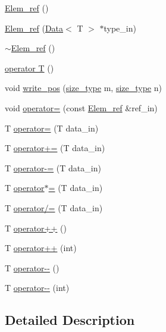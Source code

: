 \begin{DoxyCompactItemize}
\item 
\hyperlink{classlmx_1_1Elem__ref_a7e455c52699f760a552cba87266dcfc7}{Elem\-\_\-ref} ()
\item 
\hyperlink{classlmx_1_1Elem__ref_a60ccc402446b9bb02b75b2b1c9f6d119}{Elem\-\_\-ref} (\hyperlink{classlmx_1_1Data}{Data}$<$ T $>$ $\ast$type\-\_\-in)
\item 
\hyperlink{classlmx_1_1Elem__ref_ac38864e3a9029ec9d2e0ddb8404c7a3d}{$\sim$\-Elem\-\_\-ref} ()
\item 
\hyperlink{classlmx_1_1Elem__ref_a46d7401eb6f237d105282f34e63a123a}{operator T} ()
\item 
void \hyperlink{classlmx_1_1Elem__ref_a9e41a3828ca4aea8b97990fc717f21fa}{write\-\_\-pos} (\hyperlink{lmx__mat__data_8h_a49b489a408a211a90e766329c0732d7b}{size\-\_\-type} m, \hyperlink{lmx__mat__data_8h_a49b489a408a211a90e766329c0732d7b}{size\-\_\-type} n)
\item 
void \hyperlink{classlmx_1_1Elem__ref_a05886883c846e84c684aeee6dde1840d}{operator=} (const \hyperlink{classlmx_1_1Elem__ref}{Elem\-\_\-ref} \&ref\-\_\-in)
\item 
T \hyperlink{classlmx_1_1Elem__ref_af10425b417ff6d760c242cf03c14c432}{operator=} (T data\-\_\-in)
\item 
T \hyperlink{classlmx_1_1Elem__ref_a435fce2d9f1967160aa359a38b8bcf8d}{operator+=} (T data\-\_\-in)
\item 
T \hyperlink{classlmx_1_1Elem__ref_adc55b0dafb5cedf72f700a35b7f1a4c7}{operator-\/=} (T data\-\_\-in)
\item 
T \hyperlink{classlmx_1_1Elem__ref_a8484904ddce6316f6ba080f09ca1eb8e}{operator$\ast$=} (T data\-\_\-in)
\item 
T \hyperlink{classlmx_1_1Elem__ref_ad9cae55928da4c25a70e25fa8f3f0255}{operator/=} (T data\-\_\-in)
\item 
T \hyperlink{classlmx_1_1Elem__ref_ad609b17b0d826eb4c89b762fccbad914}{operator++} ()
\item 
T \hyperlink{classlmx_1_1Elem__ref_a23faa61088e40a1265ec3d956d69c9db}{operator++} (int)
\item 
T \hyperlink{classlmx_1_1Elem__ref_aa1fdaed443bf493ab9e8b44d0ea04760}{operator-\/-\/} ()
\item 
T \hyperlink{classlmx_1_1Elem__ref_a1a79c36d73ffe5dc08fe10d177e558b8}{operator-\/-\/} (int)
\end{DoxyCompactItemize}


\subsection{Detailed Description}
